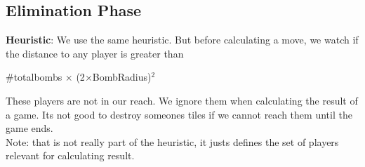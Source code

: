 \subsection{Elimination Phase}
\textbf{Heuristic}: We use the same heuristic. But before calculating a move, we watch if the distance to any player is greater than \begin{center}
    #totalbombs $\times$ (2$\times$BombRadius)$^{2}$
\end{center}
These players are not in  our reach. We ignore them when calculating the result of a game. Its not good to destroy someones tiles if we cannot reach them until the game ends.\\
Note: that is not really part of the heuristic, it justs defines the set of players relevant for calculating result.